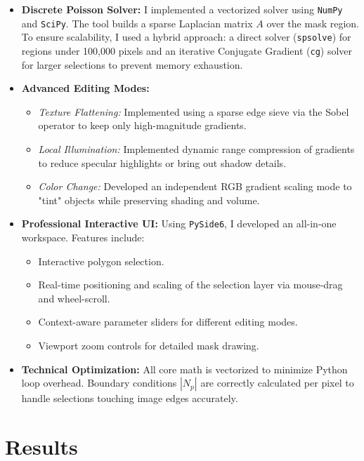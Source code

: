 \documentclass[12pt,a4paper]{report}
\begin{document}
\begin{itemize}
    \item \textbf{Discrete Poisson Solver:} I implemented a vectorized solver using \texttt{NumPy} and \texttt{SciPy}. The tool builds a sparse Laplacian matrix $A$ over the mask region. To ensure scalability, I used a hybrid approach: a direct solver (\texttt{spsolve}) for regions under 100,000 pixels and an iterative Conjugate Gradient (\texttt{cg}) solver for larger selections to prevent memory exhaustion.
    
    \item \textbf{Advanced Editing Modes:}
    \begin{itemize}
        \item \textit{Texture Flattening:} Implemented using a sparse edge sieve via the Sobel operator to keep only high-magnitude gradients.
        \item \textit{Local Illumination:} Implemented dynamic range compression of gradients to reduce specular highlights or bring out shadow details.
        \item \textit{Color Change:} Developed an independent RGB gradient scaling mode to "tint" objects while preserving shading and volume.
    \end{itemize}

    \item \textbf{Professional Interactive UI:} Using \texttt{PySide6}, I developed an all-in-one workspace. Features include:
    \begin{itemize}
        \item Interactive polygon selection.
        \item Real-time positioning and scaling of the selection layer via mouse-drag and wheel-scroll.
        \item Context-aware parameter sliders for different editing modes.
        \item Viewport zoom controls for detailed mask drawing.
    \end{itemize}
    
    \item \textbf{Technical Optimization:} All core math is vectorized to minimize Python loop overhead. Boundary conditions $|N_p|$ are correctly calculated per pixel to handle selections touching image edges accurately.
\end{itemize}

\chapter{Results}
\end{document}
